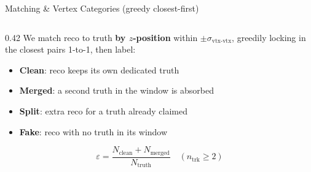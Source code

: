 \documentclass[xcolor=table,aspectratio=169]{beamer}
\newcommand{\ntrk}{\ensuremath{n_\mathrm{trk}}}
\begin{document}
\begin{frame}[shrink=15]{Matching \& Vertex Categories (greedy closest-first)}
    \begin{columns}[c]
        \begin{column}{0.42\linewidth}
            \footnotesize
            We match reco to truth \textbf{by $z$-position} within $\pm\sigma_{\text{vtx-vtx}}$,
            greedily locking in the closest pairs 1-to-1, then label:
            \begin{itemize}\setlength\itemsep{0.35em}
                \item \textcolor{mygreen!70!black}{\textbf{Clean}}: reco keeps its own dedicated truth
                \item \textcolor{myorange!85!black}{\textbf{Merged}}: a second truth in the window is absorbed
                \item \textcolor{myblue}{\textbf{Split}}: extra reco for a truth already claimed
                \item \textcolor{myred}{\textbf{Fake}}: reco with no truth in its window
            \end{itemize}
            \vspace{0.2em}
            \[\varepsilon = \frac{N_\text{clean}+N_\text{merged}}{N_\text{truth}}\quad(\ntrk\geq2)\]
            \vspace{-0.6em}


\end{column}
\end{columns}
\end{frame}
\end{document}

